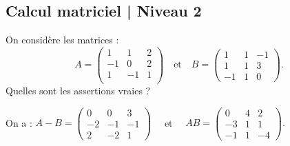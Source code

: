 \subsection{Calcul matriciel | Niveau 2}

\begin{question}
On considère les matrices : 
$$A=  
\left(\begin{array}{rcc}
1&1&2\\
-1&0&2\\
1&-1&1\\
\end{array}\right) \quad \mbox{et} \quad 
B=    
\left(\begin{array}{rcc}
1&1&-1\\
1&1&3\\
-1&1&0\end{array}\right). $$
Quelles sont les assertions vraies ?
\begin{answers}  
\end{answers}
\begin{explanations} On a : 
$A-B= \left(\begin{array}{rcc}
0&0&3\\
-2&-1&-1\\
2&-2&1\end{array}\right) \quad $ et 
$ \quad AB=  \left(\begin{array}{rcc}
0&4&2\\ -3&1&1\\
-1&1&-4\end{array}\right).$
\end{explanations}
\end{question}
  
